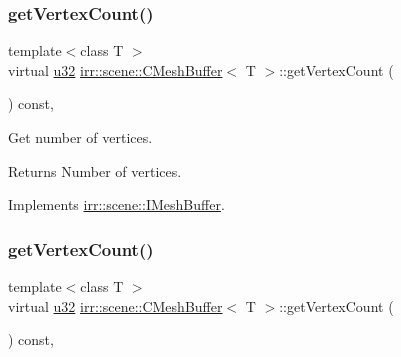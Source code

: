 \subsubsection{\texorpdfstring{get\+Vertex\+Count()}{getVertexCount()}\hspace{0.1cm}{\footnotesize\ttfamily [1/2]}}
{\footnotesize\ttfamily template$<$class T $>$ \\
virtual \hyperlink{namespaceirr_a0416a53257075833e7002efd0a18e804}{u32} \hyperlink{classirr_1_1scene_1_1CMeshBuffer}{irr\+::scene\+::\+C\+Mesh\+Buffer}$<$ T $>$\+::get\+Vertex\+Count (\begin{DoxyParamCaption}{ }\end{DoxyParamCaption}) const\hspace{0.3cm}{\ttfamily [inline]}, {\ttfamily [virtual]}}



Get number of vertices. 

\begin{DoxyReturn}{Returns}
Number of vertices. 
\end{DoxyReturn}


Implements \hyperlink{classirr_1_1scene_1_1IMeshBuffer_a77ab285c8c886af8ddeb0371db7bde96}{irr\+::scene\+::\+I\+Mesh\+Buffer}.

\mbox{\label{classirr_1_1scene_1_1CMeshBuffer_a72ee778498eff327a20c6be179976994}} 
\subsubsection{\texorpdfstring{get\+Vertex\+Count()}{getVertexCount()}\hspace{0.1cm}{\footnotesize\ttfamily [2/2]}}
{\footnotesize\ttfamily template$<$class T $>$ \\
virtual \hyperlink{namespaceirr_a0416a53257075833e7002efd0a18e804}{u32} \hyperlink{classirr_1_1scene_1_1CMeshBuffer}{irr\+::scene\+::\+C\+Mesh\+Buffer}$<$ T $>$\+::get\+Vertex\+Count (\begin{DoxyParamCaption}{ }\end{DoxyParamCaption}) const\hspace{0.3cm}{\ttfamily [inline]}, {\ttfamily [virtual]}}



